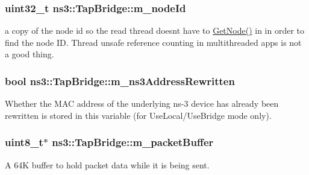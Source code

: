 \subsubsection[{\texorpdfstring{m\+\_\+node\+Id}{m_nodeId}}]{\setlength{\rightskip}{0pt plus 5cm}uint32\+\_\+t ns3\+::\+Tap\+Bridge\+::m\+\_\+node\+Id\hspace{0.3cm}{\ttfamily [private]}}\hypertarget{classns3_1_1TapBridge_a2176c6e2dba8e66c1dc45145cb54d395}{}\label{classns3_1_1TapBridge_a2176c6e2dba8e66c1dc45145cb54d395}
a copy of the node id so the read thread doesn\textquotesingle{}t have to \hyperlink{classns3_1_1TapBridge_ae200e9184e81dcad678e1016ff0375c6}{Get\+Node()} in in order to find the node ID. Thread unsafe reference counting in multithreaded apps is not a good thing. 
\subsubsection[{\texorpdfstring{m\+\_\+ns3\+Address\+Rewritten}{m_ns3AddressRewritten}}]{\setlength{\rightskip}{0pt plus 5cm}bool ns3\+::\+Tap\+Bridge\+::m\+\_\+ns3\+Address\+Rewritten\hspace{0.3cm}{\ttfamily [private]}}\hypertarget{classns3_1_1TapBridge_a3200dc6b4b46d2f0fb13c867fcb0d118}{}\label{classns3_1_1TapBridge_a3200dc6b4b46d2f0fb13c867fcb0d118}
Whether the M\+AC address of the underlying ns-\/3 device has already been rewritten is stored in this variable (for Use\+Local/\+Use\+Bridge mode only). 
\subsubsection[{\texorpdfstring{m\+\_\+packet\+Buffer}{m_packetBuffer}}]{\setlength{\rightskip}{0pt plus 5cm}uint8\+\_\+t$\ast$ ns3\+::\+Tap\+Bridge\+::m\+\_\+packet\+Buffer\hspace{0.3cm}{\ttfamily [private]}}\hypertarget{classns3_1_1TapBridge_a32b939096e18f39f76a86401d182cda5}{}\label{classns3_1_1TapBridge_a32b939096e18f39f76a86401d182cda5}
A 64K buffer to hold packet data while it is being sent. 
